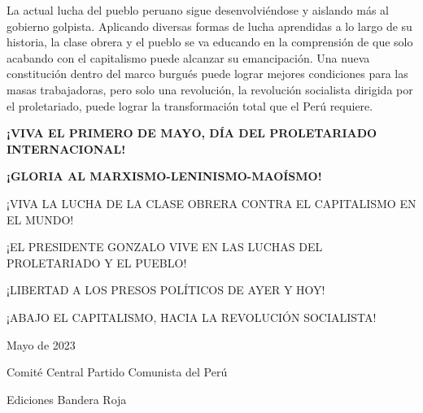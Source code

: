 \documentclass[
  a4paper,
]{article}
\begin{document}
La actual lucha del pueblo peruano sigue desenvolviéndose y aislando más
al gobierno golpista. Aplicando diversas formas de lucha aprendidas a lo
largo de su historia, la clase obrera y el pueblo se va educando en la
comprensión de que solo acabando con el capitalismo puede alcanzar su
emancipación. Una nueva constitución dentro del marco burgués puede
lograr mejores condiciones para las masas trabajadoras, pero solo una
revolución, la revolución socialista dirigida por el proletariado, puede
lograr la transformación total que el Perú requiere.

\textbf{¡VIVA EL PRIMERO DE MAYO, DÍA DEL PROLETARIADO INTERNACIONAL!}

\textbf{¡GLORIA AL MARXISMO-LENINISMO-MAOÍSMO!}

¡VIVA LA LUCHA DE LA CLASE OBRERA CONTRA EL CAPITALISMO EN EL MUNDO!

¡EL PRESIDENTE GONZALO VIVE EN LAS LUCHAS DEL PROLETARIADO Y EL PUEBLO!

¡LIBERTAD A LOS PRESOS POLÍTICOS DE AYER Y HOY!

¡ABAJO EL CAPITALISMO, HACIA LA REVOLUCIÓN SOCIALISTA!

Mayo de 2023

Comité Central Partido Comunista del Perú

Ediciones Bandera Roja


\printbibliography
\end{document}
